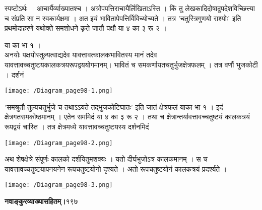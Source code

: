 \documentclass[11pt, openany]{book}
\begin{document}
\begin{sloppypar}
\hangindent=0.2in \hspace{0.2in}स्पष्टोऽर्थः । आचार्यैर्व्याख्यातश्च । अत्रोपपत्तिराचायैर्लिखिताऽस्ति । किं तु लेखकादिदोषादुपदेशविच्छित्त्या च संप्रति सा न स्वकार्यक्षमा । अत इयं भावितापेपत्तिर्विविच्योच्यते । तत्र 'चतुस्त्रिगुणयो राश्योः' इति प्रथमोदाहरणे यथोक्ते समशोधने कृते जातौ पक्षौ या ४ का ३ रू २ । 

\hspace{4.75in}या का भा १ । \\

\hangindent=0.2in अनयोः पक्षयोस्तुल्यत्वाद्यदेव यावत्तावत्कालकभावितस्य मानं तदेव यावत्तावच्चतुष्टयकालकत्रयरूपद्वययोगमानम्। भावितं च समकर्णायतचतुर्भुजक्षेत्रफलम् । तत्र वर्णौ भुजकोटी । दर्शनं\\

\begin{center}
\hspace{0.2in}\texttt{[image: /Diagram\_page98-1.png]}
\end{center}

\hangindent=0.2in \hspace{0.2in}'समश्रुतौ तुल्यचतुर्भुजे च तथाऽऽयते तद्भुजकोटिघातः' इति जातं क्षेत्रफलं याका भा १ । इदं क्षेत्रगतसमकोष्ठमानम् । एतेन सममिदं या ४ का ३ रू २ । तथा च  क्षेत्रान्तर्यावत्तावच्चतुष्टयं कालकत्रयं रूपद्वयं चास्ति । तत्र क्षेत्रमध्ये यावत्तावच्चतुष्टयस्य दर्शनमिदं\\

 \begin{center}
\hspace{0.2in}\texttt{[image: /Diagram\_page98-2.png]}
\end{center}

\hangindent=0.2in \hspace{0.2in}अथ शेषक्षेत्रे संपूर्णः कालको दर्शयितुमशक्यः । यतो दीर्घभुजोऽत्र कालकमानम् । स च यावत्तावच्चतुष्टयापनयनेन रूपचतुष्टयोनो दृश्यते । अतो रूपचतुष्टयोनं कालकत्रयं प्रदर्श्यते ।\\

\begin{center}
\hspace{0.2in}\texttt{[image: /Diagram\_page98-3.png]}
\end{center}
\end{sloppypar}
\thispagestyle{empty}
\newpage

\onehalfspacing
\hspace{2in}\textbf{नवाङ्कुरव्याख्यासहितम्।}\hspace{2in}१९७ 
\end{document}
